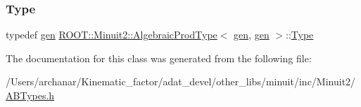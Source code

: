 \mbox{\label{classROOT_1_1Minuit2_1_1AlgebraicProdType_3_01gen_00_01gen_01_4_a423aa1dfc05f189aa1a3809d355a5efe}} 
\subsubsection{\texorpdfstring{Type}{Type}\hspace{0.1cm}{\footnotesize\ttfamily [2/2]}}
{\footnotesize\ttfamily typedef \mbox{\hyperlink{classROOT_1_1Minuit2_1_1gen}{gen}} \mbox{\hyperlink{classROOT_1_1Minuit2_1_1AlgebraicProdType}{R\+O\+O\+T\+::\+Minuit2\+::\+Algebraic\+Prod\+Type}}$<$ \mbox{\hyperlink{classROOT_1_1Minuit2_1_1gen}{gen}}, \mbox{\hyperlink{classROOT_1_1Minuit2_1_1gen}{gen}} $>$\+::\mbox{\hyperlink{classROOT_1_1Minuit2_1_1AlgebraicProdType_3_01gen_00_01gen_01_4_a423aa1dfc05f189aa1a3809d355a5efe}{Type}}}



The documentation for this class was generated from the following file\+:\begin{DoxyCompactItemize}
\item 
/\+Users/archanar/\+Kinematic\+\_\+factor/adat\+\_\+devel/other\+\_\+libs/minuit/inc/\+Minuit2/\mbox{\hyperlink{other__libs_2minuit_2inc_2Minuit2_2ABTypes_8h}{A\+B\+Types.\+h}}\end{DoxyCompactItemize}
